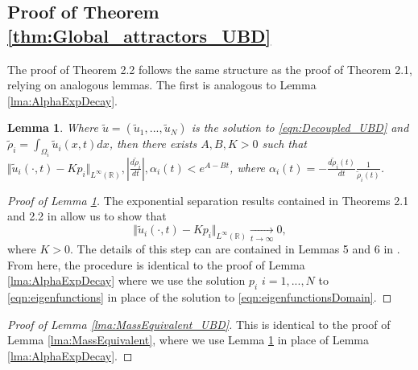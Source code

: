 \documentclass{article}
\newtheorem{lemma}{Lemma}[section]
\begin{document}
  

\subsection{Proof of Theorem \ref{thm:Global_attractors_UBD}}

The proof of Theorem 2.2 follows the same structure as the proof of Theorem 2.1, relying on analogous lemmas. The first is analogous to Lemma \ref{lma:AlphaExpDecay}.

\begin{lemma}\label{lma:AlphaExpDecay_UBD}
    Where $\tilde{u}=(\tilde{u}_1,...,\tilde{u}_N)$ is the solution to \eqref{eqn:Decoupled_UBD} and $\tilde{\rho}_i=\int_{\Omega_i}\tilde{u}_i(x,t)dx$, then there exists $A,B,K>0$ such that $\Vert{}\tilde{u}_i(\cdot,t)-Kp_i\Vert_{L^\infty(\mathbb{R})},\left|\frac{d\tilde{\rho}_i}{dt}\right|,\alpha_i(t)<e^{A-Bt}$, where $\alpha_i(t)=-\frac{d\tilde{\rho}_i(t)}{dt}\frac{1}{\tilde{\rho}_i(t)}$.
\end{lemma}


\begin{proof}[Proof of Lemma \ref{lma:AlphaExpDecay_UBD}]
 

The exponential separation results contained in Theorems 2.1 and 2.2 in \cite{huska2008exponential} allow us to show that \[\Vert{}\tilde{u}_i(\cdot,t)-Kp_i\Vert_{L^\infty(\mathbb{R})}\xrightarrow[t\rightarrow\infty]{}0,\]
     where $K>0$.  The details of this step can are contained in Lemmas 5 and 6 in \cite{adaptivedynamicsdivergingfitness}. From here, the procedure is identical to the proof of Lemma \ref{lma:AlphaExpDecay} where we use the solution $p_i$ $i=1,...,N$ to \eqref{eqn:eigenfunctions} in place of the solution to \eqref{eqn:eigenfunctionsDomain}. 
     



      
\end{proof}

\begin{proof}[Proof of Lemma \ref{lma:MassEquivalent_UBD}]
    This is identical to the proof of Lemma \ref{lma:MassEquivalent}, where we use Lemma \ref{lma:AlphaExpDecay_UBD} in place of Lemma \ref{lma:AlphaExpDecay}.
\end{proof}
\end{document}
